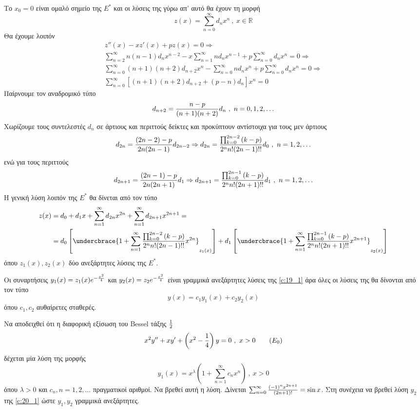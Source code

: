 \documentclass[a4paper,twoside,11pt]{book}
\newcounter{askhsh}[section]
\renewcommand{\theaskhsh}{\arabic{askhsh}}
\newenvironment{Askhshs}[1][\linewidth]
{\refstepcounter{askhsh}
\begin{tcolorbox}[breakable,
enhanced standard,
boxrule=0pt,titlerule=-0pt,fuzzy shadow={1.5mm}{-1.5mm}{0mm}{.35mm}{black!70!white},
width=\linewidth,
title style={color=white},
overlay unbroken and first={
\path[left color=red!80!black,right color=red!70!white,draw=none]
([yshift=-\pgflinewidth]frame.north west) to ([yshift=-5pt]title.south west)[rounded corners=0pt] -- ([yshift=-5pt]title.south east) to[rounded corners=2pt] ([yshift=-\pgflinewidth]frame.north east)[rounded corners=2pt] -- cycle;
},
fonttitle=\bfseries,
before=\par\medskip\noindent,
after=\par\medskip,
toptitle=4pt,
top=10pt,topsep at break=-5pt,
colback=white!20,title={\large {\raisebox{-.7mm}{\OnAskm{Άσκηση #1.\theaskhsh}}\ \  |\ \ \raisebox{-.4mm}{\textcolor{white}{\large \faIcon{pen}}}}}]}
{\end{tcolorbox}}
\DeclareRobustCommand{\frac}[3][0pt]{%
{\begingroup\hspace{#1}#2\hspace{#1}\endgroup\over\hspace{#1}#3\hspace{#1}}}
\begin{document}
\begin{rlist}
Το $ x_0=0 $ είναι ομαλό σημείο της $ E^* $ και οι λύσεις της γύρω απ' αυτό θα έχουν τη μορφή
\[ z(x)=\sum_{n=0}^{\infty}{d_nx^n}\ ,\ x\in\mathbb{R} \]
Θα έχουμε λοιπόν
\begin{gather*}
z''(x)-xz'(x)+pz(x)=0\Rightarrow\\
\sum_{n=2}^{\infty}{n(n-1)d_nx^{n-2}}-x\sum_{n=1}^{\infty}{nd_nx^{n-1}}+p\sum_{n=0}^{\infty}{d_nx^n}=0\Rightarrow\\
\sum_{n=0}^{\infty}{(n+1)(n+2)d_{n+2}x^{n}}-\sum_{n=0}^{\infty}{nd_nx^{n}}+p\sum_{n=0}^{\infty}{d_nx^n}=0\Rightarrow\\
\sum_{n=0}^{\infty}{\left[(n+1)(n+2)d_{n+2}+(p-n)d_n\right]x^n}=0
\end{gather*}
Παίρνουμε τον αναδρομικό τύπο
\[ d_{n+2}=\frac{n-p}{(n+1)(n+2)}d_n\ ,\ n=0,1,2,\ldots \]
Χωρίζουμε τους συντελεστές $ d_n $ σε άρτιους και περιττούς δείκτες και προκύπτουν αντίστοιχα για τους μεν άρτιους
\[ d_{2n}=\frac{(2n-2)-p}{2n(2n-1)}d_{2n-2}\Rightarrow d_{2n}=\frac{\prod_{k=0}^{2n-2}{(k-p)}}{2^nn!(2n-1)!!}d_0\ ,\ n=1,2,\ldots \]
ενώ για τους περιττούς
\[ d_{2n+1}=\frac{(2n-1)-p}{2n(2n+1)}d_1\Rightarrow d_{2n+1}=\frac{\prod_{k=0}^{2n-1}{(k-p)}}{2^nn!(2n+1)!!}d_1\ ,\ n=1,2,\ldots \]
Η γενική λύση λοιπόν της $ E^* $ θα δίνεται από τον τύπο
\begin{align*}
z(x)&=d_0+d_1x+\sum_{n=1}^{\infty}{d_{2n}x^{2n}}+\sum_{n=1}^{\infty}{d_{2n+1}x^{2n+1}}=\\
&=d_0\left[\undercbrace{1+\sum_{n=1}^{\infty}{\frac{\prod_{k=0}^{2n-2}{(k-p)}}{2^nn!(2n-1)!!}x^{2n}}}_{z_1(x)}\right]+d_1\left[\undercbrace{1+\sum_{n=1}^{\infty}{\frac{\prod_{k=0}^{2n-1}{(k-p)}}{2^nn!(2n+1)!!}x^{2n+1}}}_{z_2(x)}\right]
\end{align*}
όπου $ z_1(x),z_2(x) $ δύο ανεξάρτητες λύσεις της $ E^* $.
\item Οι συναρτήσεις $ y_1(x)=z_1(x)e^{-\frac{x^2}{4}} $ και $ y_2(x)=z_2e^{-\frac{x^2}{4}} $ είναι γραμμικά ανεξάρτητες λύσεις της \eqref{c:19_1} άρα όλες οι λύσεις της θα δίνονται από τον τύπο
\[ y(x)=c_1y_1(x)+c_2y_2(x) \]
όπου $ c_1,c_2 $ αυθαίρετες σταθερές.
\end{rlist}
\begin{Askhshs}[C]
Να αποδειχθεί ότι η διαφορική εξίσωση του Bessel τάξης $ \frac{1}{2} $
\begin{equation}\label{c:20_1}
x^2y''+xy'+\left(x^2-\frac{1}{4}\right)y=0\ ,\ x>0\tag{$ E_0 $}
\end{equation}
δέχεται μία λύση της μορφής
\[ y_1(x)=x^{\lambda}\left(1+\sum_{n=1}^{\infty}{c_nx^n}\right)\ ,\ x>0 \]
όπου $ \lambda>0 $ και $ c_n,n=1,2,\ldots $ πραγματικοί αριθμοί. Να βρεθεί αυτή η λύση. Δίνεται $ \sum_{n=0}^{\infty}{\frac{(-1)^nx^{2n+1}}{(2n+1)!}}=\sin{x} $. Στη συνέχεια να βρεθεί λύση $ y_2 $ της \eqref{c:20_1} ώστε $ y_1,y_2 $ γραμμικά ανεξάρτητες.
\end{Askhshs}\mbox{}\\\\
\end{document}
